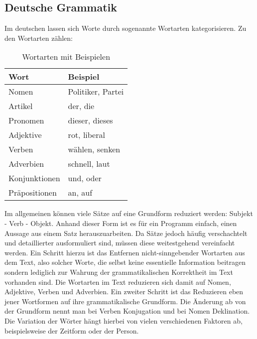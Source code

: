 \subsection{Deutsche Grammatik	}
Im deutschen lassen sich Worte durch sogenannte Wortarten kategorisieren. Zu den Wortarten zählen: \\
\begin{table}
\center
\begin{tabular}{ll}
\hline
Wort & Beispiel \\
\hline
Nomen & Politiker, Partei \\
Artikel & der, die \\
Pronomen & dieser, dieses \\
Adjektive & rot, liberal \\
Verben & wählen, senken \\
Adverbien & schnell, laut \\
Konjunktionen & und, oder \\
Präpositionen & an, auf \\
\hline
\end{tabular}
\caption{Wortarten mit Beispielen}
\end{table}
Im allgemeinen können viele Sätze auf eine Grundform reduziert werden: Subjekt - Verb - Objekt. Anhand dieser Form ist es für ein Programm einfach,
einen Aussage aus einem Satz herauszuarbeiten. Da Sätze jedoch häufig verschachtelt und detaillierter ausformuliert sind, müssen diese weitestgehend vereinfacht
werden. Ein Schritt hierzu ist das Entfernen nicht-sinngebender Wortarten aus dem Text, also solcher Worte, die selbst keine essentielle Information beitragen 
sondern lediglich zur Wahrung der grammatikalischen Korrektheit im Text vorhanden sind. Die Wortarten im Text reduzieren sich damit auf Nomen, Adjektive, Verben
und Adverbien.
Ein zweiter Schritt ist das Reduzieren eben jener Wortformen auf ihre grammatikalische Grundform. Die Änderung ab von der Grundform nennt man bei Verben Konjugation
und bei Nomen Deklination. Die Variation der Wörter hängt hierbei von vielen verschiedenen Faktoren ab, beispielsweise der Zeitform oder der Person.


